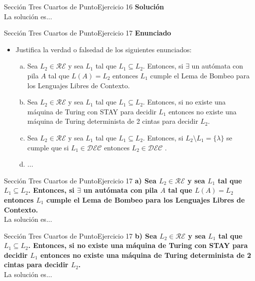 \documentclass[10pt, envcountsect, presentation, aspectratio=169]{beamer}
\newcommand{\ld}{\ensuremath{\mathcal {DEC}}}
\newcommand{\lr}{\ensuremath{\mathcal {RE}}}
\begin{document}

\begin{frame}{Sección Tres Cuartos de Punto}{Ejercicio 16}
    \textbf{Solución}\\
    La solución es...
\end{frame}


\begin{frame}{Sección Tres Cuartos de Punto}{Ejercicio 17}
    \textbf{Enunciado}
    \begin{itemize}
        \item Justifica la verdad o falsedad de los siguientes enunciados:
        \begin{enumerate}[a)]
            \item Sea $L_2 \in \lr$ y sea $L_1$ tal que $L_1 \subseteq L_2$. Entonces, si $\exists$ un autómata con pila $A$ tal que $L(A)=L_2$ entonces $L_1$ cumple el Lema de Bombeo para los Lenguajes Libres de Contexto. 
            \item Sea $L_2 \in \lr$ y sea $L_1$ tal que $L_1 \subseteq L_2$. Entonces, si no  existe una máquina de Turing con  STAY para decidir $L_1$ entonces no existe una máquina de Turing determinista de 2 cintas para decidir $L_2$.
            \item Sea $L_2 \in \lr$ y sea $L_1$ tal que $L_1 \subseteq L_2$. Entonces, si $L_2 \setminus L_1=\{\lambda\}$ se cumple que si $L_1 \in \ld$ entonces $L_2 \in \ld$ .
            \item ...
        \end{enumerate}
    \end{itemize}
\end{frame}


\begin{frame}{Sección Tres Cuartos de Punto}{Ejercicio 17}
    \textbf{a) Sea $L_2 \in \lr$ y sea $L_1$ tal que $L_1 \subseteq L_2$. Entonces, si $\exists$ un autómata con pila $A$ tal que $L(A)=L_2$ entonces $L_1$ cumple el Lema de Bombeo para los Lenguajes Libres de Contexto.}\\
    La solución es...
\end{frame}


\begin{frame}{Sección Tres Cuartos de Punto}{Ejercicio 17}
    \textbf{b) Sea $L_2 \in \lr$ y sea $L_1$ tal que $L_1 \subseteq L_2$. Entonces, si no  existe una máquina de Turing con  STAY para decidir $L_1$ entonces no existe una máquina de Turing determinista de 2 cintas para decidir $L_2$.}\\
    La solución es...
\end{frame}
\end{document}
